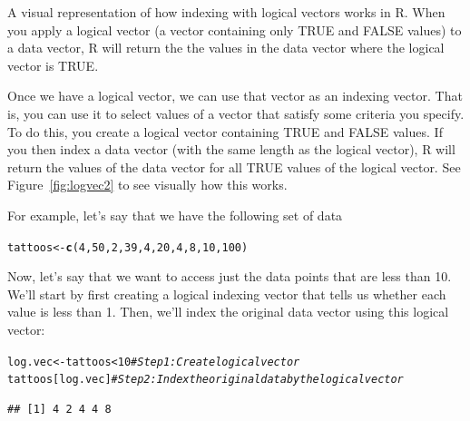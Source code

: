 \documentclass{tufte-book}\usepackage[]{graphicx}\usepackage[]{color}
\makeatletter
\newcommand{\hlnum}[1]{\textcolor[rgb]{0.686,0.059,0.569}{#1}}%
\newcommand{\hlcom}[1]{\textcolor[rgb]{0.678,0.584,0.686}{\textit{#1}}}%
\newcommand{\hlopt}[1]{\textcolor[rgb]{0,0,0}{#1}}%
\newcommand{\hlstd}[1]{\textcolor[rgb]{0.345,0.345,0.345}{#1}}%
\newcommand{\hlkwb}[1]{\textcolor[rgb]{0.69,0.353,0.396}{#1}}%
\newcommand{\hlkwd}[1]{\textcolor[rgb]{0.737,0.353,0.396}{\textbf{#1}}}%
\newenvironment{kframe}{%
 \def\at@end@of@kframe{}%
 \ifinner\ifhmode%
  \def\at@end@of@kframe{\end{minipage}}%
  \begin{minipage}{\columnwidth}%
 \fi\fi%
 \def\FrameCommand##1{\hskip\@totalleftmargin \hskip-\fboxsep
 \colorbox{shadecolor}{##1}\hskip-\fboxsep
     \hskip-\linewidth \hskip-\@totalleftmargin \hskip\columnwidth}%
 \MakeFramed {\advance\hsize-\width
   \@totalleftmargin\z@ \linewidth\hsize
   \@setminipage}}%
 {\par\unskip\endMakeFramed%
 \at@end@of@kframe}
\newenvironment{knitrout}{}{} %
\makeatother
\begin{document}
\begin{footnotesize}
\begin{marginfigure}
\begin{tiny}
\begin{knitrout}
\end{knitrout}
\end{tiny}
\label{fig:logvec2}
\caption{A visual representation of how indexing with logical vectors works in R. When you apply a logical vector (a vector containing only TRUE and FALSE values) to a data vector, R will return the the values in the data vector where the logical vector is TRUE.}
\end{marginfigure}

Once we have a logical vector, we can use that vector as an indexing vector. That is, you can use it to select values of a vector that satisfy some criteria you specify. To do this, you create a logical vector containing TRUE and FALSE values. If you then index a data vector (with the same length as the logical vector), R will return the values of the data vector for all TRUE values of the logical vector. See Figure~\ref{fig:logvec2} to see visually how this works.


For example, let's say that we have the following set of data

\begin{footnotesize}
\begin{knitrout}
\color{fgcolor}\begin{kframe}
\begin{alltt}
\hlstd{tattoos} \hlkwb{<-} \hlkwd{c}\hlstd{(}\hlnum{4}\hlstd{,} \hlnum{50}\hlstd{,} \hlnum{2}\hlstd{,} \hlnum{39}\hlstd{,} \hlnum{4}\hlstd{,} \hlnum{20}\hlstd{,} \hlnum{4}\hlstd{,} \hlnum{8}\hlstd{,} \hlnum{10}\hlstd{,} \hlnum{100}\hlstd{)}
\end{alltt}
\end{kframe}
\end{knitrout}
\end{footnotesize}

Now, let's say that we want to access just the data points that are less than 10. We'll start by first creating a logical indexing vector that tells us whether each value is less than 1. Then, we'll index the original data vector using this logical vector:

\begin{footnotesize}
\begin{knitrout}
\color{fgcolor}\begin{kframe}
\begin{alltt}
\hlstd{log.vec} \hlkwb{<-} \hlstd{tattoos} \hlopt{<} \hlnum{10} \hlcom{# Step 1: Create logical vector}
\hlstd{tattoos[log.vec]} \hlcom{# Step 2: Index the original data by the logical vector}
\end{alltt}
\begin{verbatim}
## [1] 4 2 4 4 8
\end{verbatim}
\end{kframe}
\end{knitrout}
\end{footnotesize}



\end{footnotesize}
\end{document}
